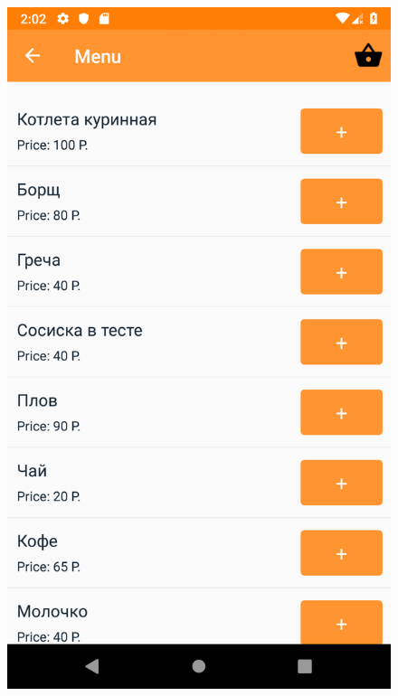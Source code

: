 \documentclass[14pt]{matmex-diploma-custom}
\begin{document}
\begin{figure}[h!]
{\begin{minipage}[t]{0.3\textwidth}
	                \includegraphics[width=\textwidth]{images/stolovka_screen_02}
	            \end{minipage}}
	        \hfill
\end{figure}
\end{document}
